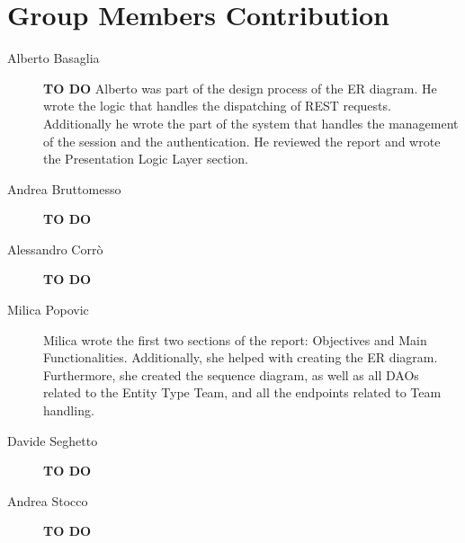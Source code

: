 \section{Group Members Contribution}


\begin{description}
	\item[Alberto Basaglia] \textbf{TO DO}
Alberto was part of the design process of the ER diagram.
He wrote the logic that handles the dispatching of REST requests.
Additionally he wrote the part of the system that handles the management of the session and the authentication.
He reviewed the report and wrote the Presentation Logic Layer section.
	\item[Andrea Bruttomesso] \textbf{TO DO}
	\item[Alessandro Corrò] \textbf{TO DO}
	\item[Milica Popovic]
Milica wrote the first two sections of the report: Objectives and Main Functionalities.
Additionally, she helped with creating the ER diagram.
Furthermore, she created the sequence diagram, as well as all DAOs related to the Entity Type Team, and all the endpoints related to Team handling.
	\item[Davide Seghetto] \textbf{TO DO}
	\item[Andrea Stocco] \textbf{TO DO}
\end{description}
